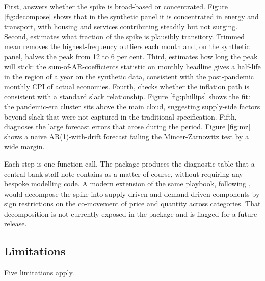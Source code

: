 First,  answers whether the spike is broad-based
or concentrated. Figure \ref{fig:decompose} shows that in the synthetic
panel it is concentrated in energy and transport, with housing and
services contributing steadily but not surging. Second,
 estimates what fraction of the spike is plausibly
transitory. Trimmed mean removes the highest-frequency outliers each
month and, on the synthetic panel, halves the peak from 12 to 6 per
cent. Third,  estimates how long the peak will
stick: the sum-of-AR-coefficients statistic on monthly headline gives a
half-life in the region of a year on the synthetic data, consistent with
the post-pandemic monthly CPI of actual economies. Fourth,
 checks whether the inflation path is consistent
with a standard slack relationship. Figure \ref{fig:phillips} shows the
fit: the pandemic-era cluster sits above the main cloud, suggesting
supply-side factors beyond slack that were not captured in the
traditional specification. Fifth,  diagnoses
the large forecast errors that arose during the period. Figure
\ref{fig:mz} shows a naive AR(1)-with-drift forecast failing the
Mincer-Zarnowitz test by a wide margin.

Each step is one function call. The package produces the diagnostic
table that a central-bank staff note contains as a matter of course,
without requiring any bespoke modelling code. A modern extension of the
same playbook, following \citet{shapiro2022supply}, would decompose the
spike into supply-driven and demand-driven components by sign
restrictions on the co-movement of price and quantity across categories.
That decomposition is not currently exposed in the package and is
flagged for a future release.

\subsection{Limitations}\label{limitations}

Five limitations apply.

